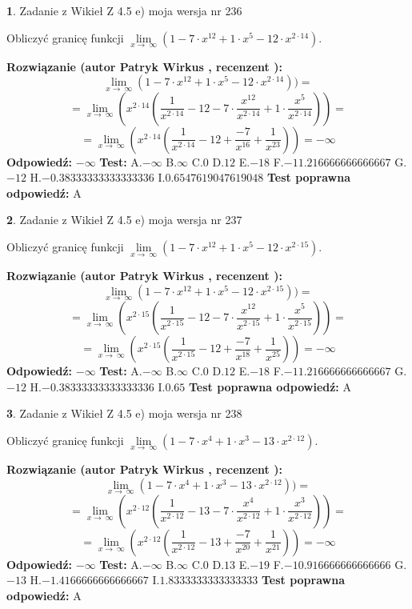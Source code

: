 \documentclass[12pt, a4paper]{article}
\theoremstyle{definition} %
\newtheorem{zad}{}
\newcommand{\zadStart}[1]{\begin{zad}#1\newline}
\newcommand{\zadStop}{\end{zad}}
\newcommand{\rozwStart}[2]{\noindent \textbf{Rozwiązanie (autor #1 , recenzent #2): }\newline}
\newcommand{\rozwStop}{\newline}
\newcommand{\odpStart}{\noindent \textbf{Odpowiedź:}\newline}
\newcommand{\odpStop}{\newline}
\newcommand{\testStart}{\noindent \textbf{Test:}\newline}
\newcommand{\testStop}{\newline}
\newcommand{\kluczStart}{\noindent \textbf{Test poprawna odpowiedź:}\newline}
\newcommand{\kluczStop}{\newline}
\begin{document}
\zadStart{Zadanie z Wikieł Z 4.5 e) moja wersja nr 236}


Obliczyć granicę funkcji  $\lim\limits_{x\to\ \infty}(1 - 7 \cdot x^{12}+1 \cdot x^{5}- 12 \cdot x^{2\cdot14})$.
\zadStop
\rozwStart{Patryk Wirkus}{}
$$\lim\limits_{x\to\ \infty}(1 - 7 \cdot x^{12}+1 \cdot x^{5}- 12 \cdot x^{2\cdot14}))=$$
$$=\lim\limits_{x\to\ \infty}(x^{2\cdot14}(\frac{1}{x^{2\cdot14}}-12 -7 \cdot \frac{x^{12}}{x^{2\cdot14}}+1 \cdot \frac{x^{5}}{x^{2\cdot14}}))=$$
$$=\lim\limits_{x\to\ \infty}(x^{2\cdot14}(\frac{1}{x^{2\cdot14}}-12 + \frac{-7}{x^{16}}+ \frac{1}{x^{23}}))=-\infty$$
\rozwStop
\odpStart
$-\infty$
\odpStop
\testStart
A.$-\infty$ B.$\infty$ C.$0$ D.$12$ E.$-18$
F.$-11.216666666666667$ G.$-12$
H.$-0.38333333333333336$
I.$0.6547619047619048$
\testStop
\kluczStart
A
\kluczStop



\zadStart{Zadanie z Wikieł Z 4.5 e) moja wersja nr 237}


Obliczyć granicę funkcji  $\lim\limits_{x\to\ \infty}(1 - 7 \cdot x^{12}+1 \cdot x^{5}- 12 \cdot x^{2\cdot15})$.
\zadStop
\rozwStart{Patryk Wirkus}{}
$$\lim\limits_{x\to\ \infty}(1 - 7 \cdot x^{12}+1 \cdot x^{5}- 12 \cdot x^{2\cdot15}))=$$
$$=\lim\limits_{x\to\ \infty}(x^{2\cdot15}(\frac{1}{x^{2\cdot15}}-12 -7 \cdot \frac{x^{12}}{x^{2\cdot15}}+1 \cdot \frac{x^{5}}{x^{2\cdot15}}))=$$
$$=\lim\limits_{x\to\ \infty}(x^{2\cdot15}(\frac{1}{x^{2\cdot15}}-12 + \frac{-7}{x^{18}}+ \frac{1}{x^{25}}))=-\infty$$
\rozwStop
\odpStart
$-\infty$
\odpStop
\testStart
A.$-\infty$ B.$\infty$ C.$0$ D.$12$ E.$-18$
F.$-11.216666666666667$ G.$-12$
H.$-0.38333333333333336$
I.$0.65$
\testStop
\kluczStart
A
\kluczStop



\zadStart{Zadanie z Wikieł Z 4.5 e) moja wersja nr 238}


Obliczyć granicę funkcji  $\lim\limits_{x\to\ \infty}(1 - 7 \cdot x^{4}+1 \cdot x^{3}- 13 \cdot x^{2\cdot12})$.
\zadStop
\rozwStart{Patryk Wirkus}{}
$$\lim\limits_{x\to\ \infty}(1 - 7 \cdot x^{4}+1 \cdot x^{3}- 13 \cdot x^{2\cdot12}))=$$
$$=\lim\limits_{x\to\ \infty}(x^{2\cdot12}(\frac{1}{x^{2\cdot12}}-13 -7 \cdot \frac{x^{4}}{x^{2\cdot12}}+1 \cdot \frac{x^{3}}{x^{2\cdot12}}))=$$
$$=\lim\limits_{x\to\ \infty}(x^{2\cdot12}(\frac{1}{x^{2\cdot12}}-13 + \frac{-7}{x^{20}}+ \frac{1}{x^{21}}))=-\infty$$
\rozwStop
\odpStart
$-\infty$
\odpStop
\testStart
A.$-\infty$ B.$\infty$ C.$0$ D.$13$ E.$-19$
F.$-10.916666666666666$ G.$-13$
H.$-1.4166666666666667$
I.$1.8333333333333333$
\testStop
\kluczStart
A
\kluczStop
\end{document}
